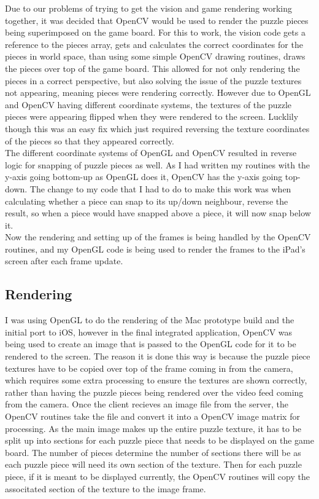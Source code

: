 \documentclass{article}
\begin{document}
Due to our problems of trying to get the vision and game rendering working
together, it was decided that OpenCV would be used to render the puzzle pieces
being superimposed on the game board. For this to work, the vision code gets a
reference to the pieces array, gets and calculates the correct coordinates for
the pieces in world space, than using some simple OpenCV drawing routines, draws
the pieces over top of the game board. This allowed for not only rendering the
pieces in a correct perspective, but also solving the issue of the puzzle
textures not appearing, meaning pieces were rendering correctly. However due to
OpenGL and OpenCV having different coordinate systems, the textures of the
puzzle pieces were appearing flipped when they were rendered to the screen.
Lucklily though this was an easy fix which just required reversing the texture
coordinates of the pieces so that they appeared correctly.\\

The different coordinate systems of OpenGL and OpenCV resulted in reverse logic
for snapping of puzzle pieces as well. As I had written my routines with the
y-axis going bottom-up as OpenGL does it, OpenCV has the y-axis going
top-down. The change to my code that I had to do to make this work was when
calculating whether a piece can snap to its up/down neighbour, reverse the
result, so when a piece would have snapped above a piece, it will now snap below
it.\\

Now the rendering and setting up of the frames is being handled by the OpenCV
routines, and my OpenGL code is being used to render the frames to the iPad's
screen after each frame update. 

\subsection{Rendering}
I was using OpenGL to do the rendering of the Mac prototype build and the
initial port to iOS, however in the final integrated application, OpenCV was
being used to create an image that is passed to the OpenGL code for it to be
rendered to the screen. The reason it is done this way is because the puzzle
piece textures have to be copied over top of the frame coming in from the
camera, which requires some extra processing to ensure the textures are shown
correctly, rather than having the puzzle pieces being rendered over the video
feed coming from the camera. Once the client recieves an image file from the
server, the OpenCV routines take the file and convert it into a OpenCV image
matrix for processing. As the main image makes up the entire puzzle texture, it
has to be split up into sections for each puzzle piece that needs to be
displayed on the game board. The number of pieces determine the number of
sections there will be as each puzzle piece will need its own section of the
texture. Then for each puzzle piece, if it is meant to be displayed currently,
the OpenCV routines will copy the associtated section of the texture to the
image frame.
\end{document}

